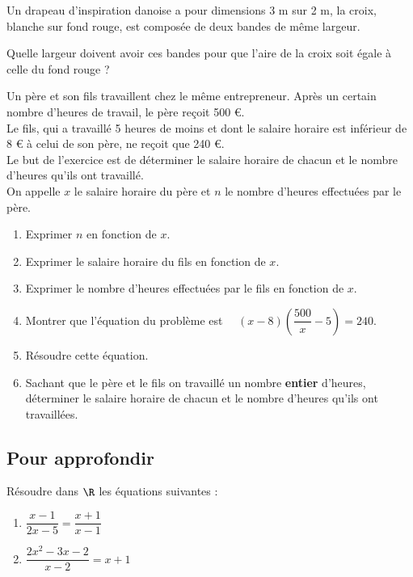\documentclass[a4paper,11pt,exos]{nsi} %
\begin{document}
	\exo{}
	Un drapeau d'inspiration danoise a pour dimensions 3 m sur 2 m, la croix, blanche sur fond rouge, est composée de deux bandes de même largeur.
	\begin{center}
		\def\larg{.3486}	
	\end{center}	
	Quelle largeur doivent avoir ces bandes pour que l'aire de la croix soit égale à celle du fond rouge ?
	
	
	\exo{$^\bigstar$}
	Un père et son fils travaillent chez le même entrepreneur. Après un certain nombre d'heures de travail, le père reçoit 500 €.\\
	Le fils, qui a travaillé 5 heures de moins et dont le salaire horaire est inférieur de 8 € à celui de son père, ne reçoit que 240 €.\\
	Le but de l'exercice est de déterminer le salaire horaire de chacun et le nombre d'heures qu'ils ont travaillé.\\[.5em]
	On appelle $x$ le salaire horaire du père et $n$ le nombre d'heures effectuées par le père.
	
	\begin{enumerate}
		\item 	Exprimer $n$ en fonction de $x$.
		\item 	Exprimer le salaire horaire du fils en fonction de $x$.
		\item 	Exprimer le nombre d'heures effectuées par le fils en fonction de $x$.
		\item 	Montrer que l'équation du problème est $\quad \left(x-8\right)\left(\dfrac{500}{x}-5\right)=240$.
		\item	Résoudre cette équation.
		\item 	Sachant que le père et le fils on travaillé un nombre \textbf{entier} d'heures, déterminer le salaire horaire de chacun et le 
		nombre d'heures qu'ils ont travaillées.
	\end{enumerate}

\subsection*{Pour approfondir}

\exo{}
Résoudre dans $\R$ les équations suivantes :
\begin{multicols}{2}
	\begin{enumerate}
		\item 	$\dfrac{x-1}{2x-5}=\dfrac{x+1}{x-1}$
		\item 	$\dfrac{2x^2-3x-2}{x-2}=x+1$
	\end{enumerate}
\end{multicols}
\end{document}
